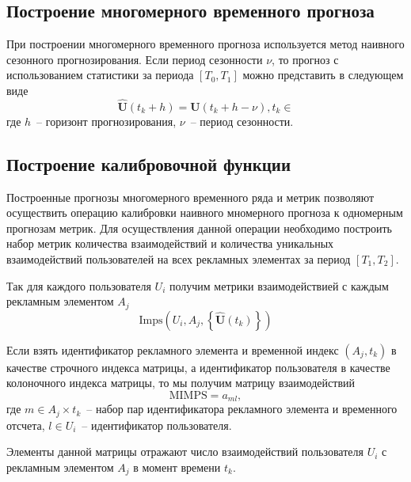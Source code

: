 \subsection{Построение многомерного временного прогноза}

    При построении многомерного временного прогноза используется метод наивного сезонного прогнозирования. 
    Если период сезонности $\nu$, то прогноз с использованием статистики за периода $\left[T_0, T_1\right]$ 
    можно представить в следующем виде
    \begin{equation}
        \widehat{\mathbf{U}}\left(t_k + h\right) = \mathbf{U}\left(t_k + h - \nu \right), t_k \in 
    \end{equation} где $h$~-- горизонт прогнозирования, $\nu$~-- период сезонности.

    \subsection{Построение калибровочной функции}

    Построенные прогнозы многомерного временного ряда и метрик позволяют осуществить операцию калибровки
    наивного мномерного прогноза к одномерным прогнозам метрик. Для осуществления данной операции необходимо
    построить набор метрик количества взаимодействий и количества уникальных взаимодействий пользователей на
    всех рекламных элементах за период $\left[T_1, T_2\right]$.

    Так для каждого пользователя $U_i$ получим метрики взаимодействией с каждым рекламным элементом $A_j$
    \begin{equation}
        \text{Imps}\left(U_i, A_j, \left\{\widehat{\mathbf{U}}\left(t_k\right)\right\}\right)
    \end{equation}

    Если взять идентификатор рекламного элемента и временной индекс $(A_j, t_k)$ в качестве строчного индекса
    матрицы, а идентификатор пользователя в качестве колоночного индекса матрицы, то мы получим матрицу взаимодействий
    \begin{equation}
        \text{MIMPS} = a_{ml},
    \end{equation} где $m \in {A_j \times t_k}$~-- набор пар идентификатора рекламного элемента и временного отсчета, 
    $l \in {U_i}$~-- идентификатор пользователя. 

    Элементы данной матрицы отражают число взаимодействий пользователя $U_i$ с рекламным элементом $A_j$ в момент времени $t_k$.

